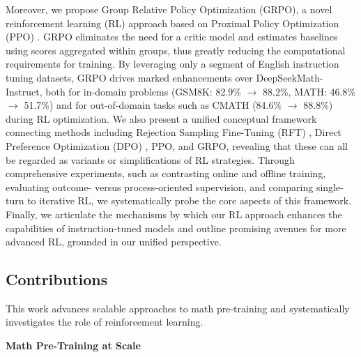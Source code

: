Moreover, we propose Group Relative Policy Optimization (GRPO), a novel reinforcement learning (RL) approach based on Proximal Policy Optimization (PPO) \citep{schulman2017proximal}. GRPO eliminates the need for a critic model and estimates baselines using scores aggregated within groups, thus greatly reducing the computational requirements for training. By leveraging only a segment of English instruction tuning datasets, GRPO drives marked enhancements over DeepSeekMath-Instruct, both for in-domain problems (GSM8K: 82.9\% $\rightarrow$ 88.2\%, MATH: 46.8\% $\rightarrow$ 51.7\%) and for out-of-domain tasks such as CMATH (84.6\% $\rightarrow$ 88.8\%) during RL optimization. We also present a unified conceptual framework connecting methods including Rejection Sampling Fine-Tuning (RFT) \citep{yuan2023scaling}, Direct Preference Optimization (DPO) \citep{dpo}, PPO, and GRPO, revealing that these can all be regarded as variants or simplifications of RL strategies. Through comprehensive experiments, such as contrasting online and offline training, evaluating outcome- versus process-oriented supervision, and comparing single-turn to iterative RL, we systematically probe the core aspects of this framework. Finally, we articulate the mechanisms by which our RL approach enhances the capabilities of instruction-tuned models and outline promising avenues for more advanced RL, grounded in our unified perspective.

\subsection{Contributions}
This work advances scalable approaches to math pre-training and systematically investigates the role of reinforcement learning.

\textbf{Math Pre-Training at Scale}

